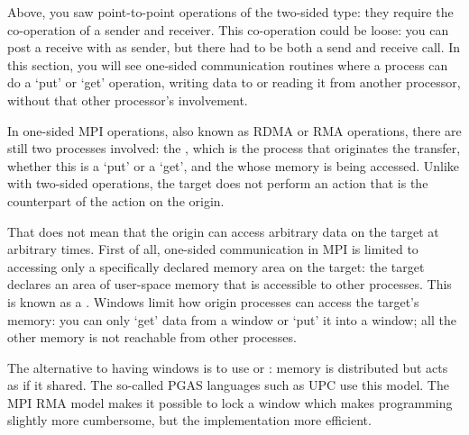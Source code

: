 

Above, you saw  point-to-point operations of the two-sided type:
they require the co-operation of a sender and
receiver. This co-operation could be loose: you can post a receive
with  as sender, but there had to be both a send and
receive call. In this section, you will see one-sided communication 
routines where a process
can do a `put' or `get' operation, writing data to or reading it from
another processor, without that other processor's involvement.

In one-sided MPI operations, also known as \acf{RDMA} or 
\acf{RMA} operations, there
are still two processes involved: the , which is the
process that originates the transfer, whether this is a `put' or a `get',
and the  whose
memory is being accessed. Unlike with two-sided operations, the target
does not perform an action that is the counterpart of the action on the origin.

That does not mean that the origin can access arbitrary data on the target
at arbitrary times. First of all, one-sided communication in MPI
is limited to accessing only a specifically declared memory area on the target:
the target declares an area of
user-space memory that is accessible to other processes. This is known
as a . Windows limit how origin processes can access
the target's memory: you can only `get' data from a window or `put' it
into a window; all the other memory is not reachable from other processes.

The alternative to having windows is to use 
or : memory is distributed but acts as if
it shared. The so-called \acf{PGAS} languages such as \ac{UPC} use this model.
The MPI \ac{RMA} model makes it possible to 
lock a window which makes programming slightly more cumbersome, but the
implementation more efficient.

